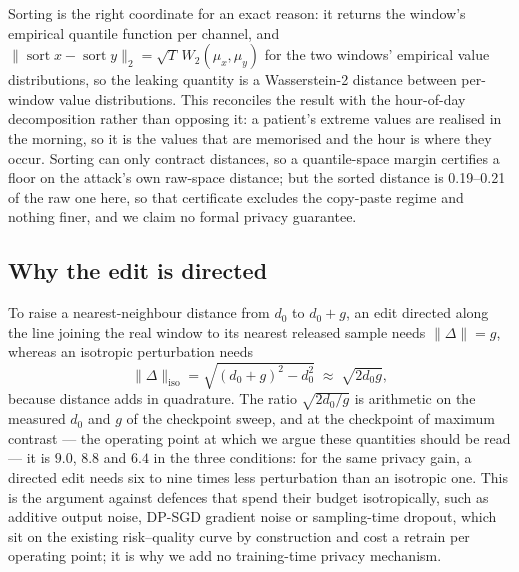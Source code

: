 \documentclass[journal]{IEEEtran}
\begin{document}
Sorting is the right coordinate for an exact reason: it returns the window's empirical
quantile function per channel, and $\lVert\operatorname{sort}x-\operatorname{sort}y\rVert_2 =
\sqrt{T}\,W_2(\mu_x,\mu_y)$ for the two windows' empirical value distributions, so the
leaking quantity is a Wasserstein-2 distance between per-window value distributions. This
reconciles the result with the hour-of-day decomposition rather than opposing it: a patient's
extreme values are realised in the morning, so it is the values that are memorised and the
hour is where they occur. Sorting can only contract distances, so a quantile-space margin
certifies a floor on the attack's own raw-space distance; but the sorted distance is
0.19--0.21 of the raw one here, so that certificate excludes the copy-paste regime and
nothing finer, and we claim no formal privacy guarantee.

\subsection{Why the edit is directed}
\label{ssec:directed}

To raise a nearest-neighbour distance from $d_0$ to $d_0+g$, an edit directed along the line
joining the real window to its nearest released sample needs $\lVert\Delta\rVert=g$, whereas
an isotropic perturbation needs
\begin{equation}
\lVert\Delta\rVert_{\text{iso}}=\sqrt{(d_0+g)^2-d_0^2}\;\approx\;\sqrt{2d_0g},
\label{eq:directed}
\end{equation}
because distance adds in quadrature. The ratio $\sqrt{2d_0/g}$ is arithmetic on the measured
$d_0$ and $g$ of the checkpoint sweep, and at the checkpoint of maximum contrast --- the
operating point at which we argue these quantities should be read --- it is $9.0$, $8.8$ and
$6.4$ in the three conditions: for the same privacy gain, a directed edit needs six to nine
times less perturbation than an isotropic one. This is the argument against defences that
spend their budget isotropically, such as additive output noise, DP-SGD gradient noise or
sampling-time dropout, which sit on the existing risk--quality curve by construction and cost
a retrain per operating point; it is why we add no training-time privacy mechanism.
\end{document}
